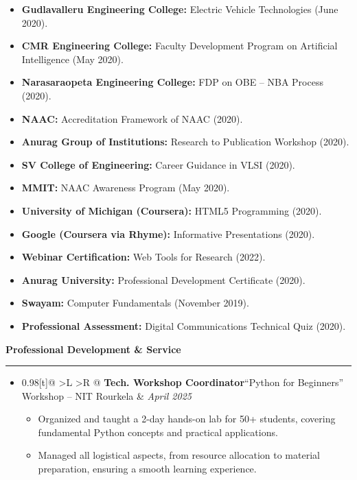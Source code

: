 \documentclass[a4paper,11pt]{article}
\makeatletter
\renewcommand{\section}[1]{%
  \vspace{8pt}%
  {\large\scshape\raggedright #1}%
  \vspace{3pt}\hrule\vspace{4pt}%
}
\newcommand{\resumePOR}[3]{
\vspace{0.5mm}\item
    \begin{tabularx}{0.98\textwidth}[t]{@{} >{\hsize=1.5\hsize}L >{\hsize=0.5\hsize}R @{}}
        \textbf{#1}\hspace{0.3mm}#2 & \textit{\small{#3}} 
    \end{tabularx}
    \vspace{-2mm}
}
\newcommand{\resumeSubHeadingListStart}{\begin{itemize}[leftmargin=*,label={},topsep=0pt,partopsep=0pt,itemsep=6pt,parsep=0pt]}
\newcommand{\resumeItemListStart}{\begin{justify}\begin{itemize}[leftmargin=3ex, rightmargin=2ex, noitemsep,labelsep=1.2mm,itemsep=0mm]\small}
\newcommand{\resumeSubHeadingListEnd}{\end{itemize}\vspace{1mm}}
\newcommand{\resumeItemListEnd}{\end{itemize}\end{justify}\vspace{-2mm}}
\makeatother
\begin{document}
\begin{itemize}[leftmargin=*, label={},topsep=0pt,partopsep=0pt,itemsep=1pt,parsep=0pt]
    \item \textbf{Gudlavalleru Engineering College:} Electric Vehicle Technologies (June 2020).
    \item \textbf{CMR Engineering College:} Faculty Development Program on Artificial Intelligence (May 2020).
    \item \textbf{Narasaraopeta Engineering College:} FDP on OBE -- NBA Process (2020).
    \item \textbf{NAAC:} Accreditation Framework of NAAC (2020).
    \item \textbf{Anurag Group of Institutions:} Research to Publication Workshop (2020).
    \item \textbf{SV College of Engineering:} Career Guidance in VLSI (2020).
    \item \textbf{MMIT:} NAAC Awareness Program (May 2020).
    \item \textbf{University of Michigan (Coursera):} HTML5 Programming (2020).
    \item \textbf{Google (Coursera via Rhyme):} Informative Presentations (2020).
    \item \textbf{Webinar Certification:} Web Tools for Research (2022).
    \item \textbf{Anurag University:} Professional Development Certificate (2020).
    \item \textbf{Swayam:} Computer Fundamentals (November 2019).
    \item \textbf{Professional Assessment:} Digital Communications Technical Quiz (2020).
\end{itemize}

\section{\textbf{Professional Development \& Service}}
\resumeSubHeadingListStart
  \resumePOR
    {Tech. Workshop Coordinator}
    {``Python for Beginners'' Workshop -- NIT Rourkela}{April 2025}
    \resumeItemListStart
      \item Organized and taught a 2-day hands-on lab for 50+ students, covering fundamental Python concepts and practical applications.
      \item Managed all logistical aspects, from resource allocation to material preparation, ensuring a smooth learning experience.
    \resumeItemListEnd
\resumeSubHeadingListEnd

\end{document}
